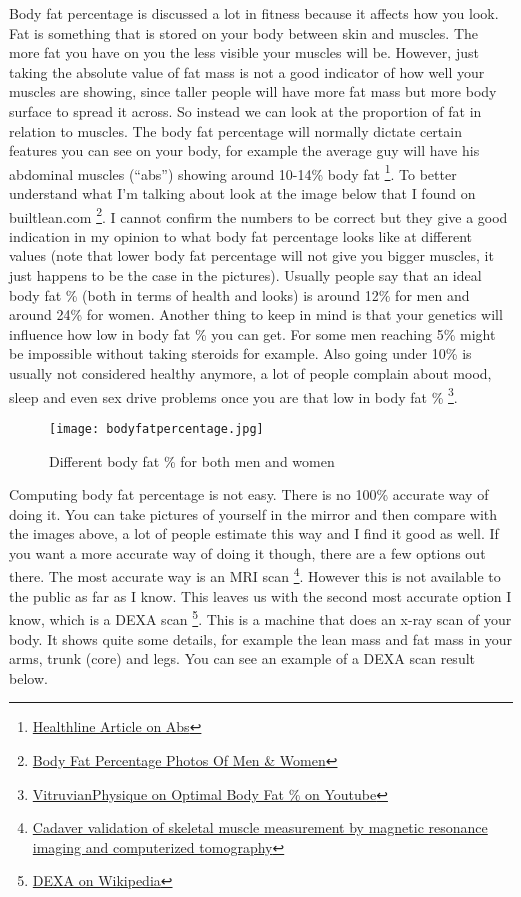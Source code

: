 \documentclass[openany, 12pt]{book}
\begin{document}
	Body fat percentage is discussed a lot in fitness because it affects how you look. Fat is something that is stored on your body between skin and muscles.
        The more fat you have on you the less visible your muscles will be. However, just taking the absolute value of fat mass is not a good indicator of how well
        your muscles are showing, since taller people will have more fat mass but more body surface to spread it across. So instead we can look at the proportion of
        fat in relation to muscles. The body fat percentage will normally dictate certain features you can see on your body, for example the average guy will have his
        abdominal muscles (``abs'') showing around 10-14\% body fat
        \footnote{\href{https://www.healthline.com/health/body-fat-percentage-for-abs}{Healthline Article on Abs}}.
        To better understand what I'm talking about look at the image below that I found on builtlean.com
        \footnote{\href{https://www.builtlean.com/body-fat-percentage-men-women/}{Body Fat Percentage Photos Of Men \& Women}}. I cannot confirm the numbers to be
        correct but they give a good indication in my opinion to what body fat percentage looks like at different values (note that lower body fat percentage will not give you
        bigger muscles, it just happens to be the case in the pictures). Usually people say that an ideal body fat \% (both in terms of health and looks) is around 12\% for men
        and around 24\% for women. Another thing to keep in mind is that your genetics will influence how low in body fat \% you can get. For some men reaching 5\% might be
        impossible without taking steroids for example. Also going under 10\% is usually not considered healthy anymore, a lot of people complain about mood, sleep and even sex
        drive problems once you are that low in body fat \%
        \footnote{\href{https://www.youtube.com/watch?v=IHvmtvzOfDg}{VitruvianPhysique on Optimal Body Fat \% on Youtube}}. 
	
	\begin{figure}[h]
		\centering
		\texttt{[image: bodyfatpercentage.jpg]}
		\caption{Different body fat \% for both men and women}
	\end{figure}
	
	Computing body fat percentage is not easy. There is no 100\% accurate way of doing it. You can take pictures of yourself in the mirror and then compare with the images above,
        a lot of people estimate this way and I find it good as well. If you want a more accurate way of doing it though, there are a few options out there. The most accurate way is an MRI scan
        \footnote{\href{https://pubmed.ncbi.nlm.nih.gov/9655763/}{Cadaver validation of skeletal muscle measurement by magnetic resonance imaging and computerized tomography}}.
        However this is not available to the public as far as I know. This leaves us with the second most accurate option I know, which is a DEXA scan
        \footnote{\href{https://en.wikipedia.org/wiki/Dual-energy_X-ray_absorptiometry}{DEXA on Wikipedia}}. This is a machine that does an x-ray scan of your body. It shows quite some details,
        for example the lean mass and fat mass in your arms, trunk (core) and legs. You can see an example of a DEXA scan result below.
\end{document}
